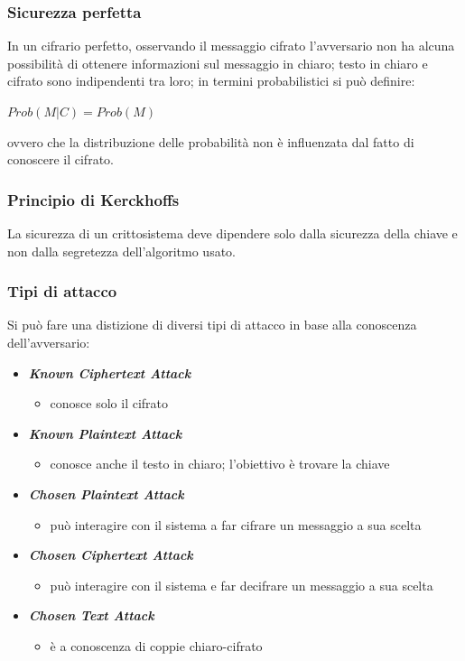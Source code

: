 \subsubsection{Sicurezza perfetta}

In un cifrario perfetto, osservando il messaggio cifrato l'avversario non ha alcuna 
possibilità di ottenere informazioni sul messaggio in chiaro; testo in chiaro e cifrato 
sono indipendenti tra loro; in termini probabilistici si può definire:

\begin{center}
    $Prob(M|C) = Prob(M)$
\end{center}

\noindent ovvero che la distribuzione delle probabilità non è influenzata dal 
fatto di conoscere il cifrato.

\subsubsection{Principio di Kerckhoffs}

La sicurezza di un crittosistema deve dipendere solo dalla sicurezza della chiave e non dalla segretezza 
dell'algoritmo usato.


\subsubsection{Tipi di attacco}

Si può fare una distizione di diversi tipi di attacco in base alla conoscenza dell'avversario:
\begin{itemize}
    \item \textbf{\textit{Known Ciphertext Attack}}
    \begin{itemize}
        \item conosce solo il cifrato
    \end{itemize}
    \item \textbf{\textit{Known Plaintext Attack}}
    \begin{itemize}
        \item conosce anche il testo in chiaro; l'obiettivo è trovare la chiave 
    \end{itemize}
    \item \textbf{\textit{Chosen Plaintext Attack}}
    \begin{itemize}
        \item può interagire con il sistema a far cifrare un messaggio a sua scelta 
    \end{itemize}
    \item \textbf{\textit{Chosen Ciphertext Attack}}
    \begin{itemize}
        \item può interagire con il sistema e far decifrare un messaggio a sua scelta 
    \end{itemize}
    \item \textbf{\textit{Chosen Text Attack}}
    \begin{itemize}
        \item è a conoscenza di coppie chiaro-cifrato
    \end{itemize}
\end{itemize}




